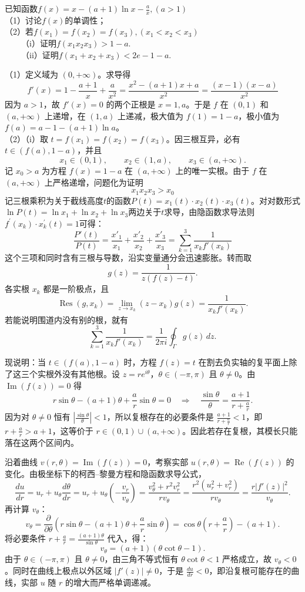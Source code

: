 \begin{example}[导数与零点]
    已知函数$f(x)=x-(a+1)\ln x-\frac{a}{x},(a>1)$\\
    （1）讨论$f(x)$的单调性；\\
    （2）若$f(x_1)=f(x_2)=f(x_3),(x_1<x_2<x_3)$\\
    ~~~~（i）证明$f(x_1x_2x_3)>1-a$.\\
    ~~~~（ii）证明$f(x_1+x_2+x_3)<2e-1-a$.
\end{example}
\begin{solution}
（1）定义域为 $(0,+\infty)$。求导得
$$f'(x)=1-\frac{a+1}x+\frac a{x^2}=\frac{x^2-(a+1)x+a}{x^2}=\frac{(x-1)(x-a)}{x^2}$$
因为 $a>1$，故 $f'(x)=0$ 的两个正根是 $x=1,a$。于是 $f$ 在 $(0,1)$ 和 $(a,+\infty)$ 上递增，在 $(1,a)$ 上递减，极大值为 $f(1)=1-a$，极小值为 $f(a)=a-1-(a+1)\ln a$。\\
（2）（i）取 $t=f(x_1)=f(x_2)=f(x_3)$。因三根互异，必有 $t\in(f(a),1-a)$，并且
\[
x_1\in(0,1),\qquad x_2\in(1,a),\qquad x_3\in(a,+\infty).
\]
记 $x_0>a$ 为方程 $f(x)=1-a$ 在 $(a,+\infty)$ 上的唯一实根。由于 $f$ 在 $(a,+\infty)$ 上严格递增，问题化为证明
$$x_1x_2x_3>x_0$$
记三根乘积为关于截线高度$t$的函数$P(t)=x_1(t)\cdot x_2(t)\cdot x_3(t)$。对对数形式$\ln P(t)=\ln x_1+\ln x_2+\ln x_3$两边关于$t$求导，由隐函数求导法则$f^\prime(x_k)\cdot x_k^{\prime}(t)=1$可得：
$$\frac{P'(t)}{P(t)}=\frac{x'_1}{x_1}+\frac{x'_2}{x_2}+\frac{x'_3}{x_3}=\sum_{k=1}^3\frac1{x_kf'(x_k)}$$
这个三项和同时含有三根与导数，沿实变量通分会迅速膨胀。转而取
$$ g(z)=\dfrac{1}{z(f(z)-t)}. $$
各实根 $x_k$ 都是一阶极点，且
$$ \operatorname{Res}(g,x_k)=\lim_{z\to x_k}(z-x_k)g(z)=\frac{1}{x_kf'(x_k)}. $$
若能说明围道内没有别的根，就有
\[
\sum_{k=1}^3\frac1{x_kf'(x_k)}=\frac{1}{2\pi i}\oint_\Gamma g(z)\,dz.
\]

现说明：当 $t\in(f(a),1-a)$ 时，方程 $f(z)=t$ 在割去负实轴的复平面上除了这三个实根外没有其他根。设 $z=r e^{i\theta}$，$\theta\in(-\pi,\pi)$ 且 $\theta\neq0$。由 $\operatorname{Im}(f(z))=0$ 得
$$r\sin\theta-(a+1)\theta+\frac{a}{r}\sin\theta=0 \quad\Longrightarrow\quad \frac{\sin\theta}{\theta}=\frac{a+1}{r+\frac{a}{r}}.$$
因为对 $\theta\neq0$ 恒有 $\left|\frac{\sin\theta}{\theta}\right|<1$，所以复根存在的必要条件是 $\frac{a+1}{r+\frac{a}{r}}<1$，即 $r+\frac{a}{r}>a+1$，这等价于 $r\in(0,1)\cup(a,+\infty)$。因此若存在复根，其模长只能落在这两个区间内。

沿着曲线 $v(r,\theta)=\operatorname{Im}(f(z))=0$，考察实部 $u(r,\theta)=\operatorname{Re}(f(z))$ 的变化。由极坐标下的柯西--黎曼方程和隐函数求导公式，
$$\frac{du}{dr}=u_r+u_\theta\frac{d\theta}{dr}=u_r+u_\theta\left(-\frac{v_r}{v_\theta}\right)=\frac{v_\theta^2+r^2v_r^2}{r v_\theta}=\frac{r^2(u_r^2+v_r^2)}{r v_\theta}=\frac{r|f'(z)|^2}{v_\theta}.$$
再计算 $v_\theta$：
$$v_\theta=\frac{\partial}{\partial\theta}\left(r\sin\theta-(a+1)\theta+\frac{a}{r}\sin\theta\right)=\cos\theta\left(r+\frac{a}{r}\right)-(a+1).$$
将必要条件 $r+\frac{a}{r}=\frac{(a+1)\theta}{\sin\theta}$ 代入，得：
$$v_\theta=(a+1)\left(\theta\cot\theta-1\right).$$
由于 $\theta\in(-\pi,\pi)$ 且 $\theta\neq0$，由三角不等式恒有 $\theta\cot\theta<1$ 严格成立，故 $v_\theta<0$。同时在曲线上极点以外区域 $|f'(z)|\neq 0$，于是 $\frac{du}{dr}<0$，即沿复根可能存在的曲线，实部 $u$ 随 $r$ 的增大而严格单调递减。


\end{solution}
